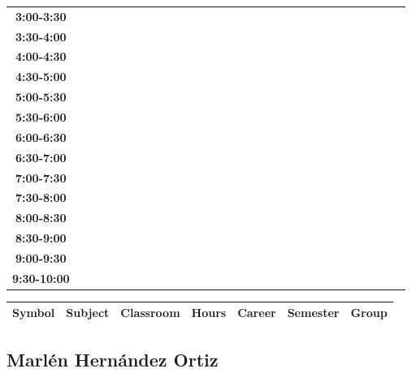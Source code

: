 \documentclass{article}
\begin{document}
\begin{table}[ht]
\begin{tabular}{|c|c|c|c|c|c|c|c|c|c|c|c|c|c|c|c|c|c|c|c|c|c|c|c|c|c|c|c|c|c|}
 \cline{1-8} 
\textbf{3:00-3:30} &   &   &   &   &   &   &   \\
 \cline{1-8} 
\textbf{3:30-4:00} &   &   &   &   &   &   &   \\
 \cline{1-8} 
\textbf{4:00-4:30} &   &   &   &   &   &   &   \\
 \cline{1-8} 
\textbf{4:30-5:00} &   &   &   &   &   &   &   \\
 \cline{1-8} 
\textbf{5:00-5:30} &   &   &   &   &   &   &   \\
 \cline{1-8} 
\textbf{5:30-6:00} &   &   &   &   &   &   &   \\
 \cline{1-8} 
\textbf{6:00-6:30} &   &   &   &   &   &   &   \\
 \cline{1-8} 
\textbf{6:30-7:00} &   &   &   &   &   &   &   \\
 \cline{1-8} 
\textbf{7:00-7:30} &   &   &   &   &   &   &   \\
 \cline{1-8} 
\textbf{7:30-8:00} &   &   &   &   &   &   &   \\
 \cline{1-8} 
\textbf{8:00-8:30} &   &   &   &   &   &   &   \\
 \cline{1-8} 
\textbf{8:30-9:00} &   &   &   &   &   &   &   \\
 \cline{1-8} 
\textbf{9:00-9:30} &   &   &   &   &   &   &   \\
 \cline{1-8} 
\textbf{9:30-10:00} &   &   &   &   &   &   &   \\
 \cline{1-8} 
\end{tabular}\end{table}

        
        \begin{tabular}{|>{\centering\arraybackslash}m{2cm}|>{\centering\arraybackslash}m{4cm}|>{\centering\arraybackslash}m{2cm}|>{\centering\arraybackslash}m{2cm}|>{\centering\arraybackslash}m{2cm}|>{\centering\arraybackslash}m{2cm}|>{\centering\arraybackslash}m{2cm}|}
        \hline
        \textbf{Symbol} & \textbf{Subject} & \textbf{Classroom} & \textbf{Hours} & \textbf{Career} & \textbf{Semester} & \textbf{Group} \\
        \hline
        \end{tabular}
                    

        \newpage
        

        \subsection{Marl\'en Hern\'andez Ortiz}
        \vspace*{.1cm}
        
\end{document}

